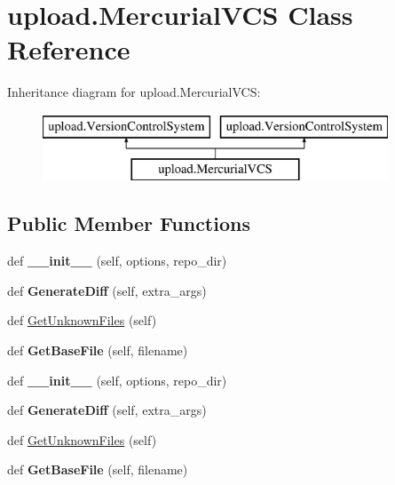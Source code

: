 \hypertarget{classupload_1_1MercurialVCS}{}\section{upload.\+Mercurial\+V\+CS Class Reference}
\label{classupload_1_1MercurialVCS}
Inheritance diagram for upload.\+Mercurial\+V\+CS\+:\begin{figure}[H]
\begin{center}
\leavevmode
\includegraphics[height=2.000000cm]{classupload_1_1MercurialVCS}
\end{center}
\end{figure}
\subsection*{Public Member Functions}
\begin{DoxyCompactItemize}
\item 
\mbox{\label{classupload_1_1MercurialVCS_a33890f442dedbb7d9fd45c08b5baed56}} 
def {\bfseries \+\_\+\+\_\+init\+\_\+\+\_\+} (self, options, repo\+\_\+dir)
\item 
\mbox{\label{classupload_1_1MercurialVCS_a6c05746012d8cd435c94ace1465671ef}} 
def {\bfseries Generate\+Diff} (self, extra\+\_\+args)
\item 
def \mbox{\hyperlink{classupload_1_1MercurialVCS_a6190899fb86cd09ad84cc5d4b0ebd2f3}{Get\+Unknown\+Files}} (self)
\item 
\mbox{\label{classupload_1_1MercurialVCS_a0cdc0cbe6ac4daab82f5f01e6ae2e670}} 
def {\bfseries Get\+Base\+File} (self, filename)
\item 
\mbox{\label{classupload_1_1MercurialVCS_a33890f442dedbb7d9fd45c08b5baed56}} 
def {\bfseries \+\_\+\+\_\+init\+\_\+\+\_\+} (self, options, repo\+\_\+dir)
\item 
\mbox{\label{classupload_1_1MercurialVCS_a6c05746012d8cd435c94ace1465671ef}} 
def {\bfseries Generate\+Diff} (self, extra\+\_\+args)
\item 
def \mbox{\hyperlink{classupload_1_1MercurialVCS_a6190899fb86cd09ad84cc5d4b0ebd2f3}{Get\+Unknown\+Files}} (self)
\item 
\mbox{\label{classupload_1_1MercurialVCS_a0cdc0cbe6ac4daab82f5f01e6ae2e670}} 
def {\bfseries Get\+Base\+File} (self, filename)
\end{DoxyCompactItemize}
